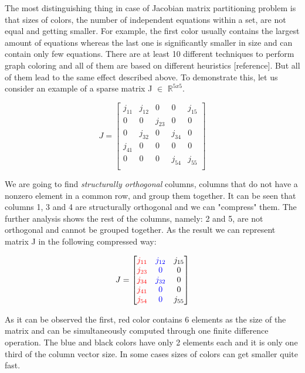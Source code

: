 The most distinguishing thing in case of Jacobian matrix partitioning problem is that sizes of colors, the number of independent equations within a set, are not equal and getting smaller. For example, the first color usually contains the largest amount of equations whereas the last one is significantly smaller in size and can contain only few equations. There are at least 10 different techniques to perform graph coloring and all of them are based on different heuristics [reference]. But all of them lead to the same effect described above. To demonstrate this, let us consider an example of a sparse matrix J $\in$ $\mathbb{R}^{5x5}$. \par
\[
J = 
\begin{bmatrix}
    j_{11} & j_{12} & 0      & 0      & j_{15}\\
    0      & 0      & j_{23} & 0      & 0     \\
    0      & j_{32} & 0      & j_{34} & 0     \\
    j_{41} & 0      & 0      & 0      & 0     \\
    0      & 0      & 0      & j_{54} & j_{55}\\
\end{bmatrix}
\]
\par
We are going to find \textit{structurally orthogonal} columns, columns that do not have a nonzero element in a common row, and group them together. It can be seen that columns 1, 3 and 4 are structurally orthogonal and we can "compress" them. The further analysis shows the rest of the columns, namely: 2 and 5, are not orthogonal and cannot be grouped together. As the result we can represent matrix J in the following compressed way:
\par
\[
J = 
\begin{bmatrix}
    {\color{red}j_{11}} & {\color{blue}j_{12}} & j_{15}\\
    {\color{red}j_{23}} & {\color{blue}0}      & 0     \\
    {\color{red}j_{34}} & {\color{blue}j_{32}} & 0     \\
    {\color{red}j_{41}} & {\color{blue}0}      & 0     \\
    {\color{red}j_{54}} & {\color{blue}0}      & j_{55}\\
\end{bmatrix}
\]
\par
As it can be observed the first, red color contains 6 elements as the size of the matrix and can be simultaneously computed through one finite difference operation. The blue and black colors have only 2 elements each and it is only one third of the column vector size. In some cases sizes of colors can get smaller quite fast.\par


